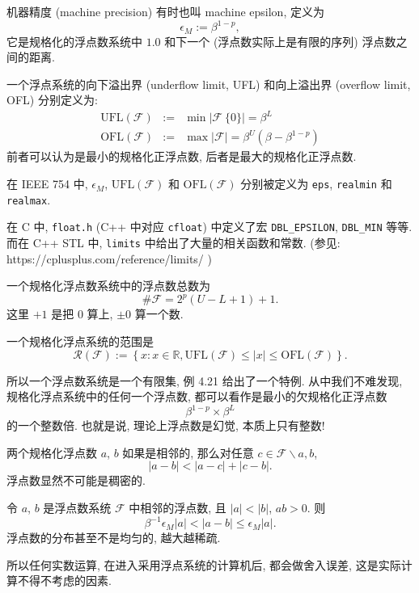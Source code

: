 \documentclass[a4paper]{ctexart}
\begin{document}
{ 机器精度 (machine precision) 有时也叫
machine epsilon, 定义为
$$
\epsilon_M := \beta^{1 - p},
$$
它是规格化的浮点数系统中 $1.0$ 和下一个 (浮点数实际上是有限的序列)
浮点数之间的距离.

 一个浮点系统的向下溢出界 (underflow limit, UFL)
和向上溢出界 (overflow limit, OFL) 分别定义为:
$$
\begin{array}{rcl}
  \mbox{UFL}(\mathscr{F}) &:=& \min \left|\mathscr{F} \ \{0\} \right|
  = \beta^{L} \\
  \mbox{OFL}(\mathscr{F}) &:=& \max \left|\mathscr{F} \right|
  = \beta^{U}\left(\beta - \beta^{1 - p}\right) 
\end{array}
$$
前者可以认为是最小的规格化正浮点数, 后者是最大的规格化正浮点数.  

 在 IEEE 754 中, $\epsilon_M$,
$\mbox{UFL}(\mathscr{F})$ 和 $\mbox{OFL}(\mathscr{F})$ 分别被定义为
\verb|eps|, \verb|realmin| 和 \verb|realmax|.

在 C 中, \verb|float.h| (C++ 中对应 \verb|cfloat|) 中定义了宏
\verb|DBL_EPSILON|, \verb|DBL_MIN| 等等. 而在 C++ STL 中,
\verb|limits| 中给出了大量的相关函数和常数.
(参见:\newline
https://cplusplus.com/reference/limits/
)

 一个规格化浮点数系统中的浮点数总数为
$$
\#\mathscr{F} = 2^p (U - L + 1) + 1.
$$
这里 $+1$ 是把 $0$ 算上, $\pm 0$ 算一个数.

 一个规格化浮点系统的范围是
$$
\mathscr{R}(\mathscr{F}) := \left\{x : x \in \mathbb{R},
\mbox{UFL}(\mathscr{F}) \leq |x| \leq \mbox{OFL}(\mathscr{F})\right\}.
$$

所以一个浮点数系统是一个有限集, 例 4.21 给出了一个特例. 从中我们不难发现,
规格化浮点系统中的任何一个浮点数, 都可以看作是最小的欠规格化正浮点数
$$
\beta^{1 - p} \times \beta^L
$$
的一个整数倍. 也就是说, 理论上浮点数是幻觉, 本质上只有整数!

 两个规格化浮点数 $a$, $b$ 如果是相邻的,
那么对任意 $c \in \mathscr{F} \backslash {a, b}$,
$$
|a - b| < |a - c| + |c - b|.
$$
浮点数显然不可能是稠密的.

 令 $a$, $b$ 是浮点数系统 $\mathscr{F}$
中相邻的浮点数, 且 $|a| < |b|$, $ab > 0$. 则
$$
\beta^{-1} \epsilon_M |a| < |a - b| \leq \epsilon_M |a|.
$$
浮点数的分布甚至不是均匀的, 越大越稀疏.

所以任何实数运算, 在进入采用浮点系统的计算机后, 都会做舍入误差,
这是实际计算不得不考虑的因素.

}
\end{document}

